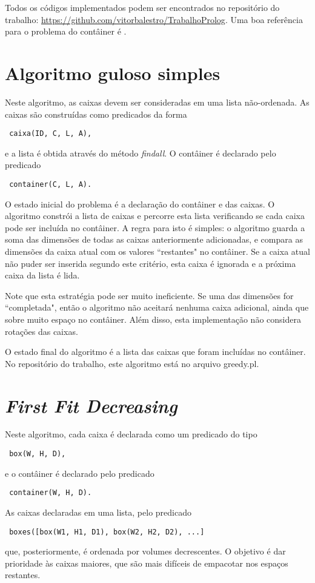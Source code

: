 \documentclass[12pt]{article}
\begin{document}
Todos os códigos implementados podem ser encontrados no repositório do trabalho: \url{https://github.com/vitorbalestro/TrabalhoProlog}. Uma boa referência para o problema do contâiner é \cite{ngoi}. 

\section{Algoritmo guloso simples}

Neste algoritmo, as caixas devem ser consideradas em uma lista não-ordenada. As caixas são construídas como predicados da forma
\begin{verbatim} caixa(ID, C, L, A),
\end{verbatim}
e a lista é obtida através do método \emph{findall}. O contâiner é declarado pelo predicado
\begin{verbatim} container(C, L, A).
\end{verbatim}

O estado inicial do problema é a declaração do contâiner e das caixas. O algoritmo constrói a lista de caixas e percorre esta lista verificando se cada caixa pode ser incluída no contâiner. A regra para isto é simples: o algoritmo guarda a soma das dimensões de todas as caixas anteriormente adicionadas, e compara as dimensões da caixa atual com os valores ``restantes" no contâiner. Se a caixa atual não puder ser inserida segundo este critério, esta caixa é ignorada e a próxima caixa da lista é lida.

Note que esta estratégia pode ser muito ineficiente. Se uma das dimensões for ``completada", então o algoritmo não aceitará nenhuma caixa adicional, ainda que sobre muito espaço no contâiner. Além disso, esta implementação não considera rotações das caixas.

O estado final do algoritmo é a lista das caixas que foram incluídas no contâiner. No repositório do trabalho, este algoritmo está no arquivo greedy.pl.

\section{\emph{First Fit Decreasing}}

Neste algoritmo, cada caixa é declarada como um predicado do tipo
\begin{verbatim} box(W, H, D),
\end{verbatim}
e o contâiner é declarado pelo predicado
\begin{verbatim} container(W, H, D).
\end{verbatim}
As caixas declaradas em uma lista, pelo predicado
\begin{verbatim} boxes([box(W1, H1, D1), box(W2, H2, D2), ...]
\end{verbatim}
que, posteriormente, é ordenada por volumes decrescentes. O objetivo é dar prioridade às caixas maiores, que são mais difíceis de empacotar nos espaços restantes.
\end{document}
